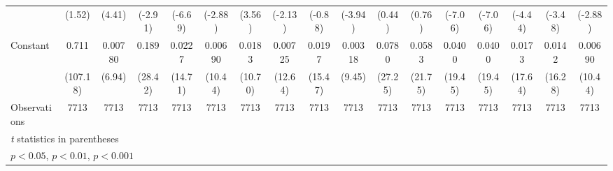 \begin{table}[htbp]
\begin{tabular}{l*{16}{c}}
                    &      (1.52)         &      (4.41)         &     (-2.91)         &     (-6.69)         &     (-2.88)         &      (3.56)         &     (-2.13)         &     (-0.88)         &     (-3.94)         &      (0.44)         &      (0.76)         &     (-7.06)         &     (-7.06)         &     (-4.44)         &     (-3.48)         &     (-2.88)         \\
\addlinespace
Constant            &       0.711\sym{***}&     0.00780\sym{***}&       0.189\sym{***}&      0.0227\sym{***}&     0.00690\sym{***}&      0.0183\sym{***}&     0.00725\sym{***}&      0.0197\sym{***}&     0.00318\sym{***}&      0.0780\sym{***}&      0.0583\sym{***}&      0.0400\sym{***}&      0.0400\sym{***}&      0.0173\sym{***}&      0.0142\sym{***}&     0.00690\sym{***}\\
                    &    (107.18)         &      (6.94)         &     (28.42)         &     (14.71)         &     (10.44)         &     (10.70)         &     (12.64)         &     (15.47)         &      (9.45)         &     (27.25)         &     (21.75)         &     (19.45)         &     (19.45)         &     (17.64)         &     (16.28)         &     (10.44)         \\
\midrule
Observations        &        7713         &        7713         &        7713         &        7713         &        7713         &        7713         &        7713         &        7713         &        7713         &        7713         &        7713         &        7713         &        7713         &        7713         &        7713         &        7713         \\
\bottomrule
\multicolumn{17}{l}{\footnotesize \textit{t} statistics in parentheses}\\
\multicolumn{17}{l}{\footnotesize \sym{*} \(p<0.05\), \sym{**} \(p<0.01\), \sym{***} \(p<0.001\)}\\
\end{tabular}
\end{table}
